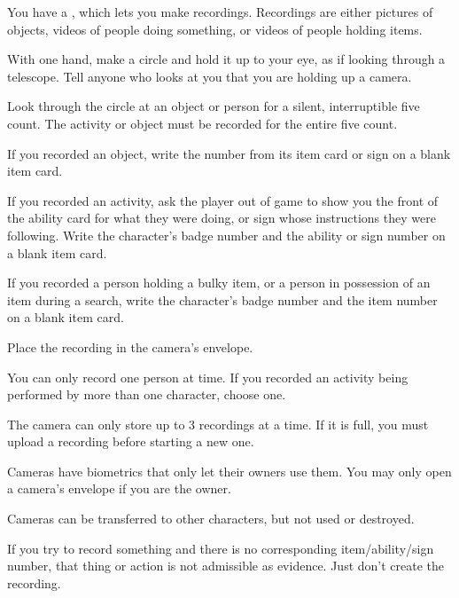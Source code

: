 \documentclass[green]{guildcamp4}
\begin{document}
\name{\gEvidence{}}

You have a \iVideoCamera{\MYname}, which lets you make recordings. Recordings are either pictures of objects, videos of people doing something, or videos of people holding items.
	
\begin{enum}
    \item With one hand, make a circle and hold it up to your eye, as if looking through a telescope. Tell anyone who looks at you that you are holding up a camera.
    \item Look through the circle at an object or person for a silent, interruptible five count. The activity or object must be recorded for the entire five count.
    \item If you recorded an object, write the number from its item card or sign on a blank item card.
    \item If you recorded an activity, ask the player out of game to show you the front of the ability card for what they were doing, or sign whose instructions they were following. Write the character's badge number and the ability or sign number on a blank item card.
    \item If you recorded a person holding a bulky item, or a person in possession of an item during a search, write the character's badge number and the item number on a blank item card.
    \item Place the recording in the camera's envelope.
\end{enum}

\begin{itemz}[Notes]
	\item You can only record one person at time. If you recorded an activity being performed by more than one character, choose one.
	\item The camera can only store up to 3 recordings at a time. If it is full, you must upload a recording before starting a new one. 
	\item Cameras have biometrics that only let their owners use them. You may only open a camera's envelope if you are the owner.
	\item Cameras can be transferred to other characters, but not used or destroyed. 
	\item If you try to record something and there is no corresponding item/ability/sign number, that thing or action is not admissible as evidence. Just don't create the recording.
\end{itemz}
    
\end{document}
